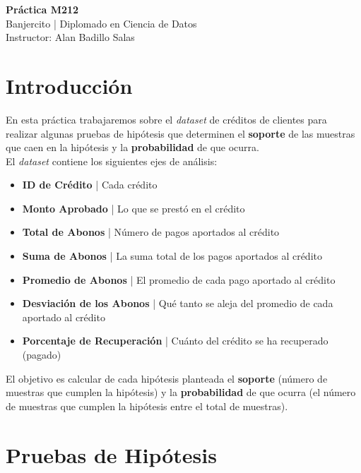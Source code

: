\documentclass{article}
\begin{document}
\begin{flushleft}
    \LARGE \textbf{Práctica M212} \\[12pt]
    \Large Banjercito | Diplomado en Ciencia de Datos \\[12pt]
    \Large Instructor: Alan Badillo Salas \\[24pt]
\end{flushleft}

\section{Introducción}

En esta práctica trabajaremos sobre el \textit{dataset} de créditos de clientes para realizar algunas pruebas de hipótesis que determinen el \textbf{soporte} de las muestras que caen en la hipótesis y la \textbf{probabilidad} de que ocurra.
\\[12pt]
El \textit{dataset} contiene los siguientes ejes de análisis:
\begin{itemize}
    \item \textbf{ID de Crédito} | Cada crédito
    \item \textbf{Monto Aprobado} | Lo que se prestó en el crédito
    \item \textbf{Total de Abonos} | Número de pagos aportados al crédito 
    \item \textbf{Suma de Abonos} | La suma total de los pagos aportados al crédito
    \item \textbf{Promedio de Abonos} | El promedio de cada pago aportado al crédito
    \item \textbf{Desviación de los Abonos} | Qué tanto se aleja del promedio de cada aportado al crédito
    \item \textbf{Porcentaje de Recuperación} | Cuánto del crédito se ha recuperado (pagado)
\end{itemize}
El objetivo es calcular de cada hipótesis planteada el \textbf{soporte} (número de muestras que cumplen la hipótesis) y la \textbf{probabilidad} de que ocurra (el número de muestras que cumplen la hipótesis entre el total de muestras).

\section{Pruebas de Hipótesis}
\end{document}
